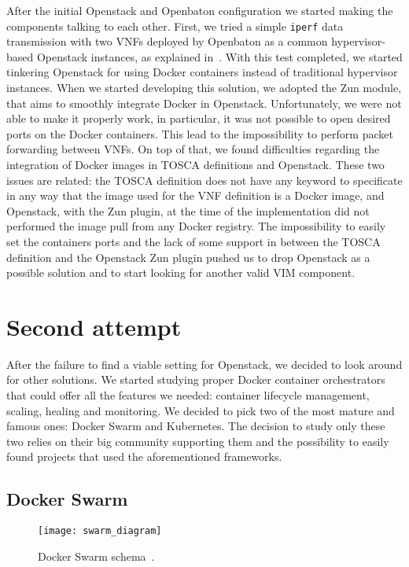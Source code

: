 After the initial Openstack and Openbaton configuration we started making the
components talking to each other. First, we tried a simple \verb!iperf! data
transmission with two VNFs deployed by Openbaton as a common hypervisor-based
Openstack instances, as explained in~\cite{openbatonIperf}. With this test
completed, we started tinkering Openstack for using Docker containers instead of
traditional hypervisor instances. When we started developing this solution, we
adopted the Zun module, that aims to smoothly integrate Docker in Openstack.
Unfortunately, we were not able to make it properly work, in particular, it was
not possible to open desired ports on the Docker containers. This lead to the
impossibility to perform packet forwarding between VNFs. On top of that, we
found difficulties regarding the integration of Docker images in TOSCA
definitions and Openstack. These two issues are related: the TOSCA definition
does not have any keyword to specificate in any way that the image used for the
VNF definition is a Docker image, and Openstack, with the Zun plugin, at the
time of the implementation did not performed the image pull from any Docker
registry. The impossibility to easily set the containers ports and the lack of
some support in between the TOSCA definition and the Openstack Zun plugin pushed
us to drop Openstack as a possible solution and to start looking for another
valid VIM component.

\section{Second attempt}

After the failure to find a viable setting for Openstack, we decided to look
around for other solutions. We started studying proper Docker container
orchestrators that could offer all the features we needed: container lifecycle
management, scaling, healing and monitoring. We decided to pick two of the most
mature and famous ones: Docker Swarm and Kubernetes. The decision to study only
these two relies on their big community supporting them and the possibility to
easily found projects that used the aforementioned frameworks.

\subsection{Docker Swarm}

\begin{figure}[t]
  \centering
  \texttt{[image: swarm\_diagram]}
  \caption[Docker Swarm schema]{Docker Swarm schema~\cite{dockerSwarmWiki}.}
  \label{chap:archimpl:sec:secondattempt:img:dockerswarm}
\end{figure}

